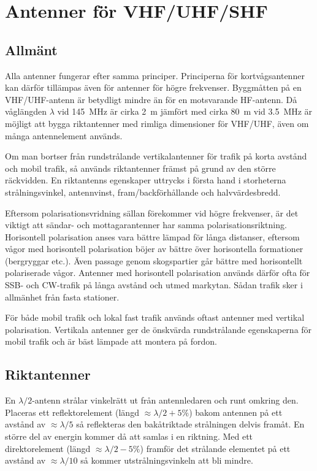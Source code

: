 \clearpage
\section{Antenner för VHF/UHF/SHF}

\subsection{Allmänt}
\label{antenner_vhf_allmänt}

Alla antenner fungerar efter samma principer.
Principerna för kortvågsantenner kan därför tillämpas även för antenner för
högre frekvenser.
Byggmåtten på en VHF/UHF-antenn är betydligt mindre än för en motsvarande
HF-antenn.
Då våglängden \(\lambda\) vid \qty{145}{\mega\hertz} är cirka \qty{2}{\metre}
jämfört med cirka \qty{80}{\metre} vid \qty{3,5}{\mega\hertz} är möjligt att
bygga riktantenner med rimliga dimensioner för VHF/UHF, även om många
antennelement används.

Om man bortser från rundstrålande vertikalantenner för trafik på korta avstånd
och mobil trafik, så används riktantenner främst på grund av den större
räckvidden.
En riktantenns egenskaper uttrycks i första hand i storheterna strålningsvinkel,
antennvinst, fram/backförhållande och halvvärdesbredd.

Eftersom polarisationsvridning sällan förekommer vid högre frekvenser, är det
viktigt att sändar- och mottagarantenner har samma polarisationsriktning.
Horisontell polarisation anses vara bättre lämpad för långa distanser, eftersom
vågor med horisontell polarisation böjer av bättre över horisontella
formationer (bergryggar etc.).
Även passage genom skogspartier går bättre med horisontellt polariserade vågor.
Antenner med horisontell polarisation används därför ofta för SSB- och CW-trafik
på långa avstånd och utmed markytan.
Sådan trafik sker i allmänhet från fasta stationer.

För både mobil trafik och lokal fast trafik används oftast antenner med vertikal
polarisation.
Vertikala antenner ger de önskvärda rundstrålande egenskaperna för mobil trafik
och är bäst lämpade att montera på fordon.

\subsection{Riktantenner}
\label{riktantenn}

En \(\lambda/2\)-antenn strålar vinkelrätt ut från antennledaren och
runt omkring den.
Placeras ett reflektorelement (längd \(\approx\lambda/2 + 5\%\)) bakom antennen
på ett avstånd av \(\approx \lambda/5\) så reflekteras den bakåtriktade
strålningen delvis framåt.
En större del av energin kommer då att samlas i en riktning.
Med ett direktorelement (längd \(\approx\lambda/2 - 5\%\)) framför det
strålande elementet på ett avstånd av \(\approx\lambda/10\) så kommer
utstrålningsvinkeln att bli mindre.

